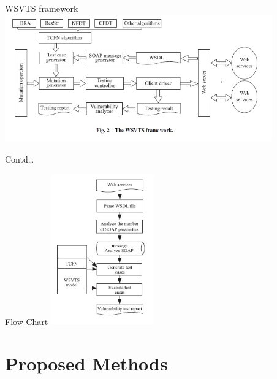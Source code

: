 \documentclass[10pt]{beamer}
\begin{document}
\begin{frame}{WSVTS framework}
	\centering
	\includegraphics[height=55mm]{Feathergraphics/WSVTS.jpg}
\end{frame}
\begin{frame}{Contd\dots}
	\begin{block}{Flow Chart}
		\centering
		\includegraphics[height=65mm]{Feathergraphics/WSflowChart.jpg}
		
	\end{block}
\end{frame}

\section{Proposed Methods}
{\1
\begin{frame}
\begin{block}{}

  \end{block}
\end{frame}}
\end{document}
